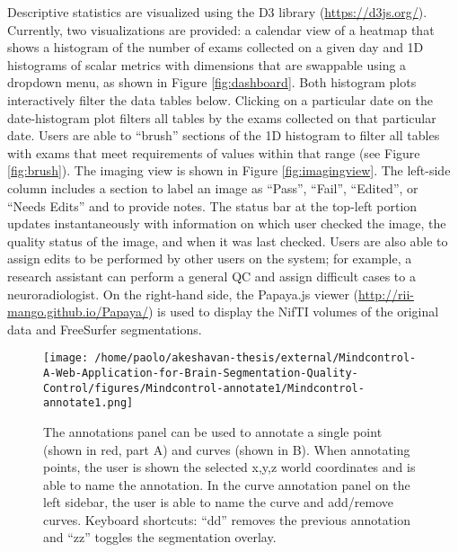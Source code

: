Descriptive statistics are visualized using the D3 library (\href{https://d3js.org/}{https://d3js.org/}). Currently, two visualizations are provided: a calendar view of a heatmap that shows a histogram of the number of exams collected on a given day and 1D histograms of scalar metrics with dimensions that are swappable using a dropdown menu, as shown in Figure \ref{fig:dashboard}. Both histogram plots interactively filter the data tables below. Clicking on a particular date on the date-histogram plot filters all tables by the exams collected on that particular date. Users are able to ``brush'' sections of the 1D histogram to filter all tables with exams that meet requirements of values within that range (see Figure \ref{fig:brush}).  
The imaging view is shown in Figure \ref{fig:imagingview}. The left-side column includes a section to label an image as ``Pass'', ``Fail'', ``Edited'', or ``Needs Edits'' and to provide notes. The status bar at the top-left portion updates instantaneously with information on which user checked the image, the quality status of the image, and when it was last checked. Users are also able to assign edits to be performed by other users on the system; for example, a research assistant can perform a general QC and assign difficult cases to a neuroradiologist. On the right-hand side, the Papaya.js viewer (\href{http://rii-mango.github.io/Papaya/}{http://rii-mango.github.io/Papaya/}) is used to display the NifTI volumes of the original data and FreeSurfer segmentations. 


\begin{figure}[]
\begin{center}
\texttt{[image: /home/paolo/akeshavan-thesis/external/Mindcontrol-A-Web-Application-for-Brain-Segmentation-Quality-Control/figures/Mindcontrol-annotate1/Mindcontrol-annotate1.png]}
\caption{ \protect\label{fig:annotate}
The annotations panel can be used to annotate a single point (shown in red, part A) and curves (shown in B). When annotating points, the user is shown the selected x,y,z world coordinates and is able to name the annotation. In the curve annotation panel on the left sidebar, the user is able to name the curve and add/remove curves. Keyboard shortcuts: ``dd'' removes the previous annotation and ``zz'' toggles the segmentation overlay.}
\end{center}
\end{figure}


